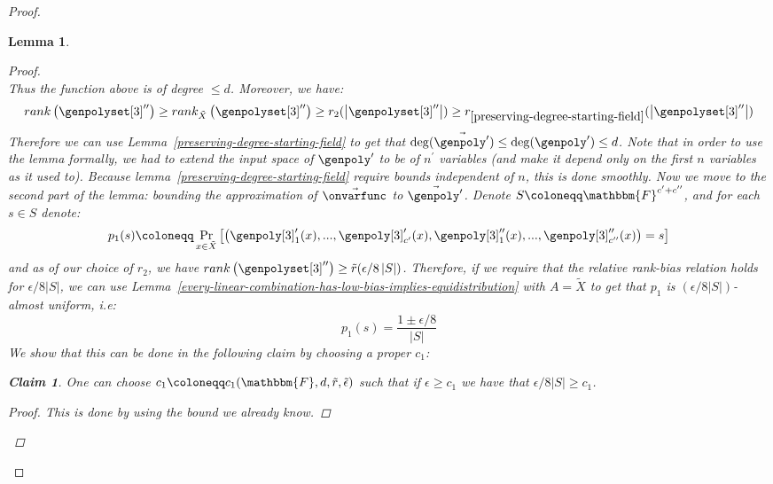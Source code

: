 \documentclass[10pt,a4paper]{article}
\newtheorem{lemma}[theorem]{Lemma}
\newtheorem{claim}[theorem]{Claim}
\newcommand{\definedas}[0]{\coloneqq}
\newcommand{\parens}[1]{\left( #1 \right)}
\newcommand{\basefield}[0]{\mathbbm{F}}
\newcommand{\blocklength}[0]{n}
\newcommand{\degree}[0]{d}
\newcommand{\variety}{{\tilde{X}}}
\newcommand{\rank}[1]{rank \parens{#1}}
\newcommand{\relrank}[2]{rank_{#1} \parens{#2}}
\newcommand{\rankfunc}[0]{{{{r}}}}
\newcommand{\rankbiasfunc}[0]{{\tilde{r}}}
\newcommand{\epsilonlimitedrankbias}[0]{{\tilde{\epsilon}}}
\newcommand{\abs}[1]{\left| #1 \right|}
\newcommand{\prex}[2]{\Pr_{#1}\left[ #2 \right]}
\begin{document}
\begin{proof}
\begin{lemma}
\begin{proof}
\[            \]
            Thus the function above is of degree $\leq \degree$.
            Moreover, we have:
            \[
                \rank{\genpolyset[3]^{\prime\prime}} \geq
                \relrank{\variety}{\genpolyset[3]^{\prime\prime}} \geq
                \rankfunc_2(\abs{\genpolyset[3]^{\prime\prime}})\geq
                \rankfunc_{\ref{preserving-degree-starting-field}}(\abs{\genpolyset[3]^{\prime\prime}})
            \]
            Therefore we can use Lemma~\ref{preserving-degree-starting-field} to get that $\deg(\vec{\genpoly^{\prime}}) \leq \deg(\genpoly^\prime) \leq \degree$.
            Note that in order to use the lemma formally,
            we had to extend the input space of $\genpoly^{\prime}$ to be of $\blocklength^{\prime}$ variables (and make it depend only on the first $\blocklength$ variables as it used to).
            Because lemma~\ref{preserving-degree-starting-field} require bounds independent of $\blocklength$, this is done smoothly.
            \newline
            Now we move to the second part of the lemma: bounding the approximation of $\vec{\onvarfunc}$ to $\vec{\genpoly^\prime}$.
            Denote $S \definedas \basefield^{c^\prime + c^{\prime\prime}}$, and for each $s \in S$ denote:
            \[
                p_1(s) \definedas \prex{x \in \variety}{
                \parens{\genpoly[3]^\prime_1(x),...,\genpoly[3]^\prime_{c^\prime}(x), \genpoly[3]^{\prime\prime}_1(x),...,\genpoly[3]^{\prime\prime}_{c^{\prime\prime}}(x)} = s}
            \]
            and as of our choice of $\rankfunc_2$, we have $\rank{\genpolyset[3]^{\prime\prime}} \geq \rankbiasfunc(\epsilon/8\abs{S})$.
            Therefore, if we require that the relative rank-bias relation holds for $\epsilon / 8\abs{S}$, we can use Lemma~\ref{every-linear-combination-has-low-bias-implies-equidistribution} with $A = \variety$
            to get that $p_1$ is $(\epsilon /8\abs{S})$-almost uniform, i.e:
            \[
                p_1(s) = \dfrac{1 \pm \epsilon / 8}{\abs{S}}
            \]
            We show that this can be done in the following claim by choosing a proper $c_1$:
            \begin{claim}
                One can choose $c_1 \definedas c_1(\basefield, \degree, \rankbiasfunc, \epsilonlimitedrankbias)$ such that if $\epsilon \geq c_1$
                we have that $\epsilon / 8\abs{S} \geq c_1$.
            \end{claim}
            \begin{proof}
                This is done by using the bound we already know.

\end{proof}
\end{proof}
\end{lemma}
\end{proof}
\end{document}
